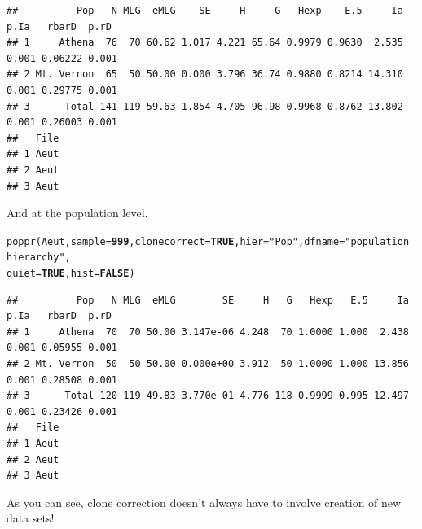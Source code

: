 \documentclass[letterpaper]{article}\usepackage[]{graphicx}\usepackage[]{color}
\makeatletter
\newcommand{\hlnum}[1]{\textcolor[rgb]{0.502,0,0.502}{\textbf{#1}}}%
\newcommand{\hlstr}[1]{\textcolor[rgb]{0.651,0.522,0}{#1}}%
\newcommand{\hlstd}[1]{\textcolor[rgb]{0,0,0}{#1}}%
\newcommand{\hlkwc}[1]{\textcolor[rgb]{0,0.502,0.753}{#1}}%
\newcommand{\hlkwd}[1]{\textcolor[rgb]{0,0.267,0.4}{#1}}%
\newenvironment{kframe}{%
 \def\at@end@of@kframe{}%
 \ifinner\ifhmode%
  \def\at@end@of@kframe{\end{minipage}}%
  \begin{minipage}{\columnwidth}%
 \fi\fi%
 \def\FrameCommand##1{\hskip\@totalleftmargin \hskip-\fboxsep
 \colorbox{shadecolor}{##1}\hskip-\fboxsep
     \hskip-\linewidth \hskip-\@totalleftmargin \hskip\columnwidth}%
 \MakeFramed {\advance\hsize-\width
   \@totalleftmargin\z@ \linewidth\hsize
   \@setminipage}}%
 {\par\unskip\endMakeFramed%
 \at@end@of@kframe}
\newenvironment{knitrout}{}{} %
\makeatother
\begin{document}
\begin{knitrout}\footnotesize
{}\color{fgcolor}\begin{kframe}
\begin{verbatim}
##          Pop   N MLG  eMLG    SE     H     G   Hexp    E.5     Ia  p.Ia   rbarD  p.rD
## 1     Athena  76  70 60.62 1.017 4.221 65.64 0.9979 0.9630  2.535 0.001 0.06222 0.001
## 2 Mt. Vernon  65  50 50.00 0.000 3.796 36.74 0.9880 0.8214 14.310 0.001 0.29775 0.001
## 3      Total 141 119 59.63 1.854 4.705 96.98 0.9968 0.8762 13.802 0.001 0.26003 0.001
##   File
## 1 Aeut
## 2 Aeut
## 3 Aeut
\end{verbatim}
\end{kframe}
\end{knitrout}

And at the population level.
\begin{knitrout}\footnotesize
{}\color{fgcolor}\begin{kframe}
\begin{alltt}
\hlkwd{poppr}\hlstd{(Aeut,} \hlkwc{sample} \hlstd{=} \hlnum{999}\hlstd{,} \hlkwc{clonecorrect} \hlstd{=} \hlnum{TRUE}\hlstd{,} \hlkwc{hier} \hlstd{=} \hlstr{"Pop"}\hlstd{,} \hlkwc{dfname} \hlstd{=} \hlstr{"population_hierarchy"}\hlstd{,}
    \hlkwc{quiet} \hlstd{=} \hlnum{TRUE}\hlstd{,} \hlkwc{hist} \hlstd{=} \hlnum{FALSE}\hlstd{)}
\end{alltt}
\end{kframe}
\end{knitrout}

\begin{knitrout}\footnotesize
{}\color{fgcolor}\begin{kframe}
\begin{verbatim}
##          Pop   N MLG  eMLG        SE     H   G   Hexp   E.5     Ia  p.Ia   rbarD  p.rD
## 1     Athena  70  70 50.00 3.147e-06 4.248  70 1.0000 1.000  2.438 0.001 0.05955 0.001
## 2 Mt. Vernon  50  50 50.00 0.000e+00 3.912  50 1.0000 1.000 13.856 0.001 0.28508 0.001
## 3      Total 120 119 49.83 3.770e-01 4.776 118 0.9999 0.995 12.497 0.001 0.23426 0.001
##   File
## 1 Aeut
## 2 Aeut
## 3 Aeut
\end{verbatim}
\end{kframe}
\end{knitrout}

As you can see, clone correction doesn't always have to involve creation of new data sets!
\end{document}
